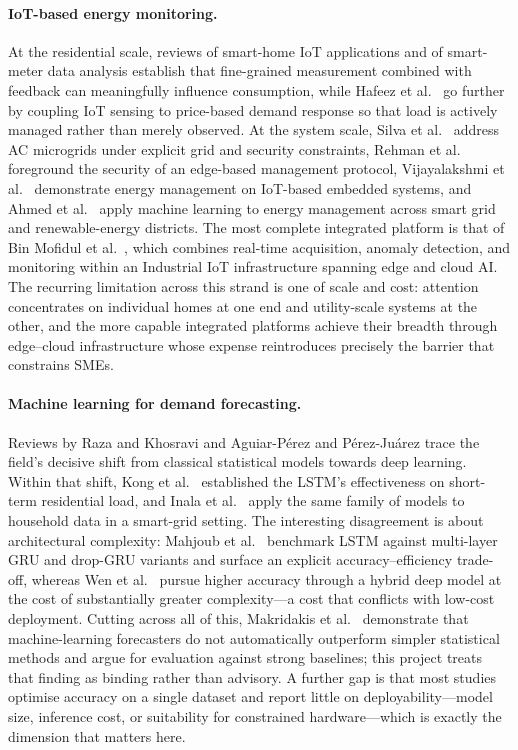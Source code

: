 \documentclass[11pt,a4paper]{article}
\begin{document}
\paragraph{IoT-based energy monitoring.}
At the residential scale, reviews of smart-home IoT applications
\cite{alaa2017review} and of smart-meter data analysis \cite{yildiz2017recent}
establish that fine-grained measurement combined with feedback can meaningfully
influence consumption, while Hafeez et al.\ \cite{hafeez2020efficient} go
further by coupling IoT sensing to price-based demand response so that load is
actively managed rather than merely observed. At the system scale, Silva et al.\
\cite{silva2023iot} address AC microgrids under explicit grid and security
constraints, Rehman et al.\ \cite{rehman2022secure} foreground the security of
an edge-based management protocol, Vijayalakshmi et al.\
\cite{vijayalakshmi2023smart} demonstrate energy management on IoT-based
embedded systems, and Ahmed et al.\ \cite{ahmed2020machine} apply machine
learning to energy management across smart grid and renewable-energy districts.
The most complete integrated platform is that of Bin Mofidul et al.\
\cite{bin2022real}, which combines real-time acquisition, anomaly detection, and
monitoring within an Industrial IoT infrastructure spanning edge and cloud AI.
The recurring limitation across this strand is one of scale and cost: attention
concentrates on individual homes at one end and utility-scale systems at the
other, and the more capable integrated platforms achieve their breadth through
edge--cloud infrastructure whose expense reintroduces precisely the barrier that
constrains SMEs.

\paragraph{Machine learning for demand forecasting.}
Reviews by Raza and Khosravi \cite{raza2015review} and Aguiar-P\'erez and
P\'erez-Ju\'arez \cite{aguiar2023insight} trace the field's decisive shift from
classical statistical models towards deep learning. Within that shift, Kong et
al.\ \cite{kong2017short} established the LSTM's effectiveness on short-term
residential load, and Inala et al.\ \cite{inala2025enhancing} apply the same
family of models to household data in a smart-grid setting. The interesting
disagreement is about architectural complexity: Mahjoub et al.\
\cite{mahjoub2022predicting} benchmark LSTM against multi-layer GRU and drop-GRU
variants and surface an explicit accuracy--efficiency trade-off, whereas Wen et
al.\ \cite{wen2024deep} pursue higher accuracy through a hybrid deep model at
the cost of substantially greater complexity---a cost that conflicts with
low-cost deployment. Cutting across all of this, Makridakis et al.\
\cite{makridakis2018statistical} demonstrate that machine-learning forecasters
do not automatically outperform simpler statistical methods and argue for
evaluation against strong baselines; this project treats that finding as
binding rather than advisory. A further gap is that most studies optimise
accuracy on a single dataset and report little on deployability---model size,
inference cost, or suitability for constrained hardware---which is exactly the
dimension that matters here.
\end{document}
